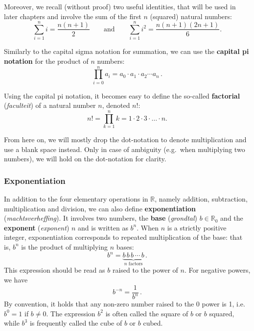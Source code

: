 Moreover, we recall (without proof) two useful identities, that will be used in later chapters and involve the sum of the first $n$ (squared) natural numbers:
\begin{equation}
\displaystyle\sum_{i=1}^n i = \dfrac{n(n+1)}{2}\qquad\text{and}\qquad\displaystyle\sum_{i=1}^n i^2 = \dfrac{n(n+1)(2n+1)}{6}.
\label{thm:summation}
\end{equation}


Similarly to the capital sigma notation for summation, we can use the \textbf{capital pi notation} for the product of $n$ numbers:
$$
\displaystyle\prod_{i=0}^n a_i=a_0\cdot a_1\cdot a_2\cdots a_n\,. 
$$

Using the capital pi notation, it becomes easy to define the so-called \textbf{factorial} (\textit{faculteit}) of a natural number $n$, denoted $n!$:
$$
n!=\prod\limits_{k=1}^{n}k=1\cdot 2\cdot 3\cdot \ldots \cdot n.
$$

From here on, we will mostly drop the dot-notation to denote multiplication and use a blank space instead. Only in case of ambiguity (e.g.\ when multiplying two numbers), we will hold on the dot-notation for clarity.

\subsubsection{Exponentiation}

In addition to the four elementary operations in $\mathbb{R}$, namely addition, subtraction, multiplication and division, we can also define \textbf{exponentiation}  (\textit{machtsverheffing}). It involves two numbers, the \textbf{base}  (\textit{grondtal}) $b\in\mathbb{R}_0$ and the \textbf{exponent} (\textit{exponent}) $n$ and is written as $b^n$. When $n$ is a strictly positive integer, exponentiation corresponds to repeated multiplication of the base: that is, $b^n$ is the product of multiplying $n$ bases:
$$
b^n=\underbrace{b\, b\, b\,\cdots\,b}_{n \text{ factors}}\,.
$$
This expression should be read as $b$ raised to the power of $n$. For negative powers, we have
$$
b^{-n}=\dfrac{1}{b^n}\,.
$$
By convention, it holds that any non-zero number raised to the 0 power is 1, i.e. $b^0=1$ if $b\neq0$. The expression $b^2$ is often  called the square of $b$ or $b$ squared, while $b^3$ is frequently called the cube of $b$ or $b$ cubed.

